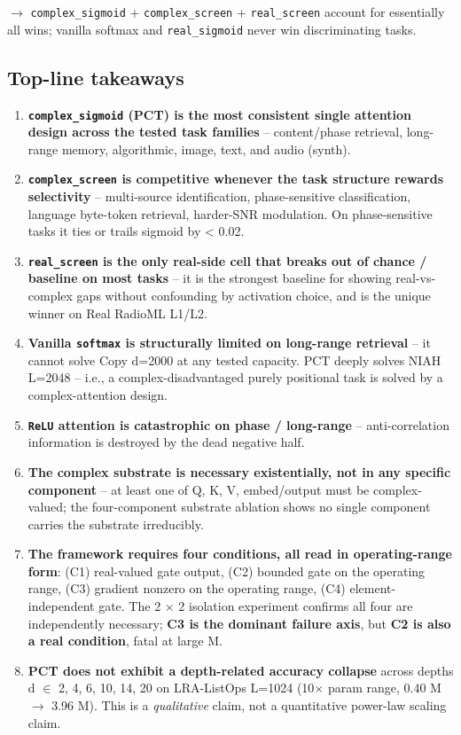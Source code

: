 \documentclass[11pt,a4paper]{article}
\theoremstyle{plain}
\theoremstyle{definition}
\begin{document}
$\to$ \texttt{complex\_sigmoid} + \texttt{complex\_screen} + \texttt{real\_screen} account for essentially all wins; vanilla softmax and \texttt{real\_sigmoid} never win discriminating tasks.

\subsection*{Top-line takeaways}
\begin{enumerate}
  \item \textbf{\texttt{complex\_sigmoid} (PCT) is the most consistent single attention design across the tested task families} -- content/phase retrieval, long-range memory, algorithmic, image, text, and audio (synth).
  \item \textbf{\texttt{complex\_screen} is competitive whenever the task structure rewards selectivity} -- multi-source identification, phase-sensitive classification, language byte-token retrieval, harder-SNR modulation. On phase-sensitive tasks it ties or trails sigmoid by < 0.02.
  \item \textbf{\texttt{real\_screen} is the only real-side cell that breaks out of chance / baseline on most tasks} -- it is the strongest baseline for showing real-vs-complex gaps without confounding by activation choice, and is the unique winner on Real RadioML L1/L2.
  \item \textbf{Vanilla \texttt{softmax} is structurally limited on long-range retrieval} -- it cannot solve Copy d=2000 at any tested capacity. PCT deeply solves NIAH L=2048 -- i.e., a complex-disadvantaged purely positional task is solved by a complex-attention design.
  \item \textbf{\texttt{ReLU} attention is catastrophic on phase / long-range} -- anti-correlation information is destroyed by the dead negative half.
  \item \textbf{The complex substrate is necessary existentially, not in any specific component} -- at least one of {Q, K, V, embed/output} must be complex-valued; the four-component substrate ablation shows no single component carries the substrate irreducibly.
  \item \textbf{The framework requires four conditions, all read in operating-range form}: (C1) real-valued gate output, (C2) bounded gate on the operating range, (C3) gradient nonzero on the operating range, (C4) element-independent gate. The 2 $\times$ 2 isolation experiment confirms all four are independently necessary; \textbf{C3 is the dominant failure axis}, but \textbf{C2 is also a real condition}, fatal at large M.
  \item \textbf{PCT does not exhibit a depth-related accuracy collapse} across depths d $\in$ {2, 4, 6, 10, 14, 20} on LRA-ListOps L=1024 (10$\times$ param range, 0.40 M $\to$ 3.96 M). This is a \emph{qualitative} claim, not a quantitative power-law scaling claim.
\end{enumerate}
\end{document}
